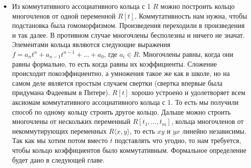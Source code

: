 \begin{itemize}
    \item Из коммутативного ассоциативного кольца с 1 $R$ можно построить
        кольцо многочленов от одной переменной $R[t]$. Коммутативность нам
        нужна, чтобы подстановка была гомоморфизмом. Произведения переходили в
        произведения и так далее. В противном случае многочлены бесполезны и 
        ничего не значат. Элементами кольца являются следующие выражения $f=a_n
        t^n + a_{n-1}t^{n-1}+...+a_0$, где $a_i\in R$. Многочлены равны, когда
        они равны формально, то есть когда равны их коэффициенты. Сложение
        происходит покоэффициентно, а умножения такое же как в школе, но на
        самом деле является простым случаем свертки (свертка впервые была
        придумана Фадеевым в Питере). $R[t]$ хорошо устроено и удолетворяет всем
        аксиомам коммутативного ассоциативного кольца с 1. То есть мы получили
        способ по одному кольцу строить другое кольцо. Дальше можно строить
        многочлены от нескольких переменный $R[t_1,...,t_m]$, кольца многочленов
        от некоммутирующих переменных $R\langle x,y\rangle$, то есть $xy$ и $yx$
        линейно независимы. Так как мы хотим потом вместо $t$ подставлять что
        угодно, то нам требуется, чтобы кольцо коэффициентов было коммутативным.
        Формальное определение будет дано в следующей главе.


\end{itemize}
